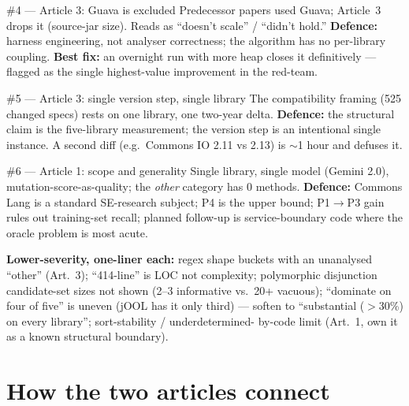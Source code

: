 \documentclass[11pt]{article}
\begin{document}
\begin{redflagbox}{\#4 --- Article 3: Guava is excluded}
Predecessor papers used Guava; Article~3 drops it (source-jar size). Reads as
``doesn't scale'' / ``didn't hold.'' \textbf{Defence:} harness engineering,
not analyser correctness; the algorithm has no per-library coupling.
\textbf{Best fix:} an overnight run with more heap closes it definitively ---
flagged as the single highest-value improvement in the red-team.
\end{redflagbox}

\begin{redflagbox}{\#5 --- Article 3: single version step, single library}
The compatibility framing (525 changed specs) rests on one library, one
two-year delta. \textbf{Defence:} the structural claim is the five-library
measurement; the version step is an intentional single instance. A second diff
(e.g.\ Commons IO 2.11 vs 2.13) is $\sim$1 hour and defuses it.
\end{redflagbox}

\begin{redflagbox}{\#6 --- Article 1: scope and generality}
Single library, single model (Gemini 2.0), mutation-score-as-quality; the
\emph{other} category has 0 methods. \textbf{Defence:} Commons Lang is a
standard SE-research subject; P4 is the upper bound; P1$\to$P3 gain rules out
training-set recall; planned follow-up is service-boundary code where the
oracle problem is most acute.
\end{redflagbox}

\textbf{Lower-severity, one-liner each:} regex shape buckets with an
unanalysed ``other'' (Art.~3); ``414-line'' is LOC not complexity; polymorphic
disjunction candidate-set sizes not shown (2--3 informative vs.\ 20+ vacuous);
``dominate on four of five'' is uneven (jOOL has it only third) --- soften to
``substantial ($>$30\%) on every library''; sort-stability / underdetermined-
by-code limit (Art.~1, own it as a known structural boundary).

\section{How the two articles connect}
\label{sec:link}
\end{document}

